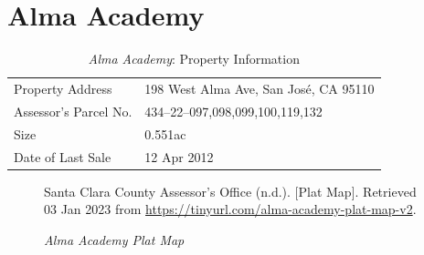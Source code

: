 
\clearpage
\section{Alma Academy}\label{sec:alma-academy-info}\indent

\begin{table}[htbp]
  \SingleSpacing%
  \caption[Alma Academy: Property Information]{\textit{Alma Academy}: Property Information}%
  \label{tab:alma-academy-prop-info}
  \begin{tabular}{ll}
    \toprule
    Property Address      & 198 West Alma Ave, San José, CA 95110 \\
    Assessor's Parcel No. & 434–22–{097,098,099,100,119,132} \\
    Size                  & 0.551ac \\
    Date of Last Sale     & 12 Apr 2012 \\
    \bottomrule
  \end{tabular}
\end{table}

\begin{figure}[hbtp]
  \caption[Alma Academy Plat Map]{\textit{Alma Academy Plat Map}}%
  \label{fig:alma-academy-plat-map}
  {Santa Clara County Assessor's Office (n.d.). [Plat Map]. Retrieved 03 Jan 2023 from  \url{https://tinyurl.com/alma-academy-plat-map-v2}.}
\end{figure}

